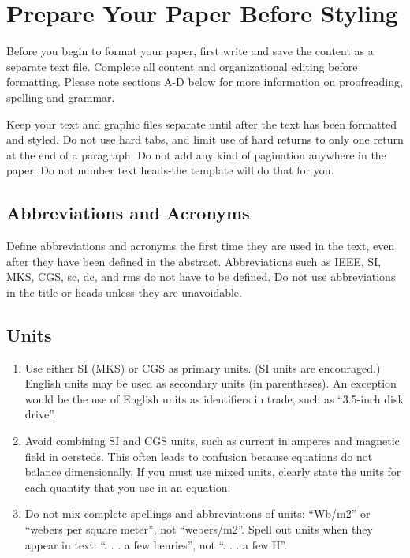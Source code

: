 \documentclass{article} %
\begin{document}
\section{ Prepare Your Paper Before Styling}

Before you begin to format your paper, first write and save the content as a separate text file. Complete all content and organizational editing before formatting. Please note sections A-D below for more information on proofreading, spelling and grammar.

Keep your text and graphic files separate until after the text has been formatted and styled. Do not use hard tabs, and limit use of hard returns to only one return at the end of a paragraph. Do not add any kind of pagination anywhere in the paper. Do not number text heads-the template will do that for you.


\subsection{ Abbreviations and Acronyms}

Define abbreviations and acronyms the first time they are used in the text, even after they have been defined in the abstract. Abbreviations such as IEEE, SI, MKS, CGS, sc, dc, and rms do not have to be defined. Do not use abbreviations in the title or heads unless they are unavoidable.


\subsection{ Units}

\begin{enumerate}
\item \textit{ }Use either SI (MKS) or CGS as primary units. (SI units are encouraged.) English units may be used as secondary units (in parentheses). An exception would be the use of English units as identifiers in trade, such as ``3.5-inch disk drive''.

\item  Avoid combining SI and CGS units, such as current in amperes and magnetic field in oersteds. This often leads to confusion because equations do not balance dimensionally. If you must use mixed units, clearly state the units for each quantity that you use in an equation.

\item  Do not mix complete spellings and abbreviations of units: ``Wb/m2'' or ``webers per square meter'', not ``webers/m2''.  Spell out units when they appear in text: ``. . . a few henries'', not ``. . . a few H''.
\end{enumerate}
\end{document}
